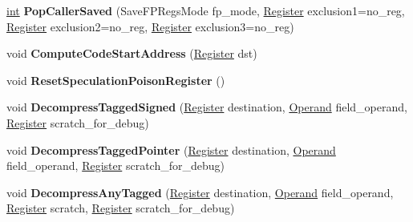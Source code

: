 \begin{DoxyCompactItemize}
\mbox{\hyperlink{classint}{int}} {\bfseries Pop\+Caller\+Saved} (Save\+F\+P\+Regs\+Mode fp\+\_\+mode, \mbox{\hyperlink{classv8_1_1internal_1_1Register}{Register}} exclusion1=no\+\_\+reg, \mbox{\hyperlink{classv8_1_1internal_1_1Register}{Register}} exclusion2=no\+\_\+reg, \mbox{\hyperlink{classv8_1_1internal_1_1Register}{Register}} exclusion3=no\+\_\+reg)
\item 
\mbox{\label{classv8_1_1internal_1_1TurboAssembler_afa16b0e3be91d3616e9f613b954621dd}} 
void {\bfseries Compute\+Code\+Start\+Address} (\mbox{\hyperlink{classv8_1_1internal_1_1Register}{Register}} dst)
\item 
\mbox{\label{classv8_1_1internal_1_1TurboAssembler_a282571b73c77ef466d68a106c557956d}} 
void {\bfseries Reset\+Speculation\+Poison\+Register} ()
\item 
\mbox{\label{classv8_1_1internal_1_1TurboAssembler_adb847d3cbb6401b52a0bcaddcd1ecc28}} 
void {\bfseries Decompress\+Tagged\+Signed} (\mbox{\hyperlink{classv8_1_1internal_1_1Register}{Register}} destination, \mbox{\hyperlink{classv8_1_1internal_1_1Operand}{Operand}} field\+\_\+operand, \mbox{\hyperlink{classv8_1_1internal_1_1Register}{Register}} scratch\+\_\+for\+\_\+debug)
\item 
\mbox{\label{classv8_1_1internal_1_1TurboAssembler_aca460aeff339491960dda88474f3ca5e}} 
void {\bfseries Decompress\+Tagged\+Pointer} (\mbox{\hyperlink{classv8_1_1internal_1_1Register}{Register}} destination, \mbox{\hyperlink{classv8_1_1internal_1_1Operand}{Operand}} field\+\_\+operand, \mbox{\hyperlink{classv8_1_1internal_1_1Register}{Register}} scratch\+\_\+for\+\_\+debug)
\item 
\mbox{\label{classv8_1_1internal_1_1TurboAssembler_a99b617495f1813a3218e805bccbda784}} 
void {\bfseries Decompress\+Any\+Tagged} (\mbox{\hyperlink{classv8_1_1internal_1_1Register}{Register}} destination, \mbox{\hyperlink{classv8_1_1internal_1_1Operand}{Operand}} field\+\_\+operand, \mbox{\hyperlink{classv8_1_1internal_1_1Register}{Register}} scratch, \mbox{\hyperlink{classv8_1_1internal_1_1Register}{Register}} scratch\+\_\+for\+\_\+debug)
\end{DoxyCompactItemize}
